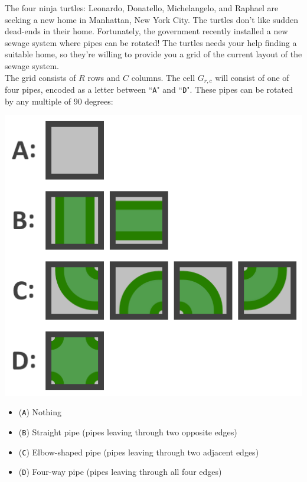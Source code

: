 
\noindent The four ninja turtles: Leonardo, Donatello, Michelangelo, and Raphael are seeking a new home in Manhattan, New York City. The turtles don't like sudden dead-ends in their home. Fortunately, the government recently installed a new sewage system where pipes can be rotated! The turtles needs your help finding a suitable home, so they're willing to provide you a grid of the current layout of the sewage system.\\

The grid consists of $R$ rows and $C$ columns. The cell $G_{r,c}$ will consist of one of four pipes, encoded as a letter between ``\texttt{A}" and ``\texttt{D}". These pipes can be rotated by any multiple of 90 degrees:\\

\noindent
\begin{minipage}{0.25\textwidth}
  \includegraphics[width=1\textwidth]{pipe_rotation_1.png}
\end{minipage}
\begin{minipage}{0.75\textwidth}
  \begin{itemize}
    \item (\texttt{A}) Nothing
    \item (\texttt{B}) Straight pipe (pipes leaving through two opposite edges)
    \item (\texttt{C}) Elbow-shaped pipe (pipes leaving through two adjacent edges)
    \item (\texttt{D}) Four-way pipe (pipes leaving through all four edges)
  \end{itemize}
\end{minipage}
\vspace{10pt}

